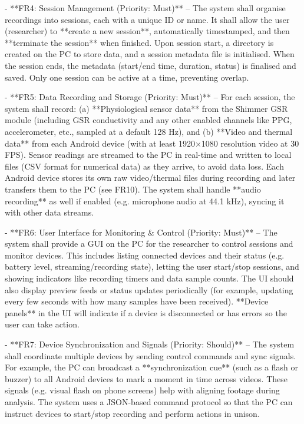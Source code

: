 \documentclass[12pt,a4paper]{article}
\begin{document}
- **FR4: Session Management (Priority: Must)** -- The system shall organise recordings into sessions, each with a unique ID or name. It shall allow the user (researcher) to **create a new session**, automatically timestamped, and then **terminate the session** when finished. Upon session start, a directory is created on the PC to store data, and a session metadata file is initialised. When the session ends, the metadata (start/end time, duration, status) is finalised and saved. Only one session can be active at a time, preventing overlap.

- **FR5: Data Recording and Storage (Priority: Must)** -- For each session, the system shall record: (a) **Physiological sensor data** from the Shimmer GSR module (including GSR conductivity and any other enabled channels like PPG, accelerometer, etc., sampled at a default 128 Hz), and (b) **Video and thermal data** from each Android device (with at least 1920×1080 resolution video at 30 FPS). Sensor readings are streamed to the PC in real-time and written to local files (CSV format for numerical data) as they arrive, to avoid data loss. Each Android device stores its own raw video/thermal files during recording and later transfers them to the PC (see FR10). The system shall handle **audio recording** as well if enabled (e.g. microphone audio at 44.1 kHz), syncing it with other data streams.

- **FR6: User Interface for Monitoring & Control (Priority: Must)** -- The system shall provide a GUI on the PC for the researcher to control sessions and monitor devices. This includes listing connected devices and their status (e.g. battery level, streaming/recording state), letting the user start/stop sessions, and showing indicators like recording timers and data sample counts. The UI should also display preview feeds or status updates periodically (for example, updating every few seconds with how many samples have been received). **Device panels** in the UI will indicate if a device is disconnected or has errors so the user can take action.

- **FR7: Device Synchronization and Signals (Priority: Should)** -- The system shall coordinate multiple devices by sending control commands and sync signals. For example, the PC can broadcast a **synchronization cue** (such as a flash or buzzer) to all Android devices to mark a moment in time across videos. These signals (e.g. visual flash on phone screens) help with aligning footage during analysis. The system uses a JSON-based command protocol so that the PC can instruct devices to start/stop recording and perform actions in unison.
\end{document}
